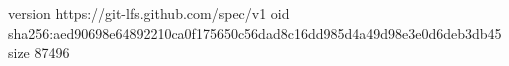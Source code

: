 version https://git-lfs.github.com/spec/v1
oid sha256:aed90698e64892210ca0f175650c56dad8c16dd985d4a49d98e3e0d6deb3db45
size 87496
